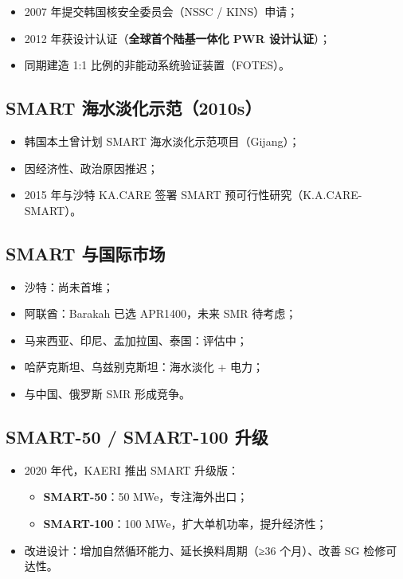 \documentclass[
  UTF8,
  scheme=plain,
  fontsize=10pt,
  openany
]{ctexbook}
\begin{document}
\begin{itemize}
\tightlist
\item
  2007 年提交韩国核安全委员会（NSSC / KINS）申请；
\item
  2012 年获设计认证（\textbf{全球首个陆基一体化 PWR 设计认证}）；
\item
  同期建造 1:1 比例的非能动系统验证装置（FOTES）。
\end{itemize}

\subsection{SMART
海水淡化示范（2010s）}\label{smart-ux6d77ux6c34ux6de1ux5316ux793aux83032010s}

\begin{itemize}
\tightlist
\item
  韩国本土曾计划 SMART 海水淡化示范项目（Gijang）；
\item
  因经济性、政治原因推迟；
\item
  2015 年与沙特 KA.CARE 签署 SMART 预可行性研究（K.A.CARE-SMART）。
\end{itemize}

\subsection{SMART
与国际市场}\label{smart-ux4e0eux56fdux9645ux5e02ux573a}

\begin{itemize}
\tightlist
\item
  沙特：尚未首堆；
\item
  阿联酋：Barakah 已选 APR1400，未来 SMR 待考虑；
\item
  马来西亚、印尼、孟加拉国、泰国：评估中；
\item
  哈萨克斯坦、乌兹别克斯坦：海水淡化 + 电力；
\item
  与中国、俄罗斯 SMR 形成竞争。
\end{itemize}

\subsection{SMART-50 / SMART-100
升级}\label{smart-50-smart-100-ux5347ux7ea7}

\begin{itemize}
\tightlist
\item
  2020 年代，KAERI 推出 SMART 升级版：

  \begin{itemize}
  \tightlist
  \item
    \textbf{SMART-50}：50 MWe，专注海外出口；
  \item
    \textbf{SMART-100}：100 MWe，扩大单机功率，提升经济性；
  \end{itemize}
\item
  改进设计：增加自然循环能力、延长换料周期（≥36 个月）、改善 SG
  检修可达性。
\end{itemize}
\end{document}
